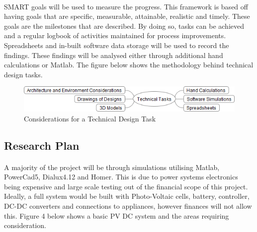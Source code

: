 \paragraph{}
SMART goals will be used to measure the progress. This framework is based off having goals that are specific, measurable, attainable, realistic and timely. These goals are the milestones that are described. By doing so, tasks can be achieved and a regular logbook of activities maintained for process improvements. Spreadsheets and in-built software data storage will be used to record the findings. These findings will be analysed either through additional hand calculations or Matlab. The figure below shows the methodology behind technical design tasks.    

\begin{figure}[H]
\hfill\includegraphics[width = 160mm]{images/Practical_Planning_Rev2}\hspace*{\fill}
\caption{Considerations for a Technical Design Task}
\label{fig:PracProcedure}
\end{figure}     

\subsection{Research Plan}

\paragraph{}
A majority of the project will be through simulations utilising Matlab, PowerCad5, Dialux4.12 and Homer. This is due to power systems electronics being expensive and large scale testing out of the financial scope of this project. Ideally, a full system would be built with Photo-Voltaic cells, battery, controller, DC-DC converters and connections to appliances, however finances will not allow this. Figure 4 below shows a basic PV DC system and the areas requiring consideration. 

